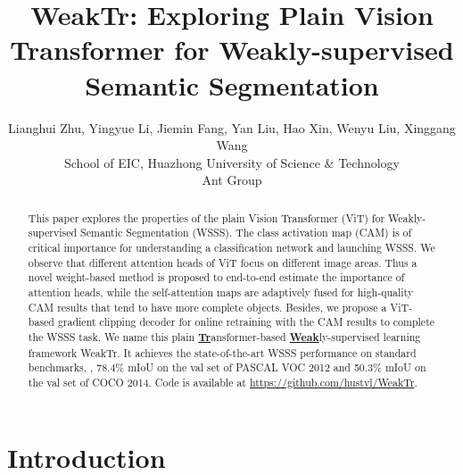 \documentclass[10pt,twocolumn,letterpaper]{article}
\begin{document}
\title{WeakTr: Exploring Plain Vision Transformer for Weakly-supervised\\Semantic Segmentation}

\newcommand{\name}{WeakTr}

\author{Lianghui Zhu, Yingyue Li, Jiemin Fang, Yan Liu, Hao Xin, Wenyu Liu, Xinggang Wang\\
School of EIC, Huazhong University of Science \& Technology\\
 Ant Group\\
}

\ificcvfinal\thispagestyle{empty}\fi


\maketitle

{
\renewcommand{\thefootnote}{\fnsymbol{footnote}}
}










\begin{abstract}
  This paper explores the properties of the plain Vision Transformer (ViT) for Weakly-supervised Semantic Segmentation (WSSS). The class activation map (CAM) is of critical importance for understanding a classification network and launching WSSS. We observe that different attention heads of ViT focus on different image areas. Thus a novel weight-based method is proposed to end-to-end estimate the importance of attention heads, while the self-attention maps are adaptively fused for high-quality CAM results that tend to have more complete objects. Besides, we propose a ViT-based gradient clipping decoder for online retraining with the CAM results to complete the WSSS task. We name this plain \underline{\textbf{Tr}}ansformer-based \underline{\textbf{Weak}}ly-supervised learning framework \name{}. It achieves the state-of-the-art WSSS performance on standard benchmarks, \ie, 78.4\% mIoU on the val set of PASCAL VOC 2012 and 50.3\% mIoU on the val set of COCO 2014.
  Code is available at \url{https://github.com/hustvl/WeakTr}.
\end{abstract}



\section{Introduction}
\label{sec:intro}

\end{document}
